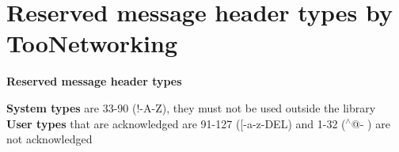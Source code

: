 \hypertarget{group__RESERVED__TYPES}{}\section{Reserved message header types by Too\+Networking}
\label{group__RESERVED__TYPES}
{\bfseries Reserved message header types}

{\bfseries System types} are 33-\/90 (\textquotesingle{}!\textquotesingle{}-\/A\textquotesingle{}-\/\textquotesingle{}Z\textquotesingle{}), they must not be used outside the library~\newline
 {\bfseries User types} that are acknowledged are 91-\/127 (\textquotesingle{}\mbox{[}\textquotesingle{}-\/\textquotesingle{}a\textquotesingle{}-\/\textquotesingle{}z\textquotesingle{}-\/\textquotesingle{}D\+EL\textquotesingle{}) and 1-\/32 (\textquotesingle{}$^\wedge$@\textquotesingle{}-\/\textquotesingle{} \textquotesingle{}) are not acknowledged~\newline
 